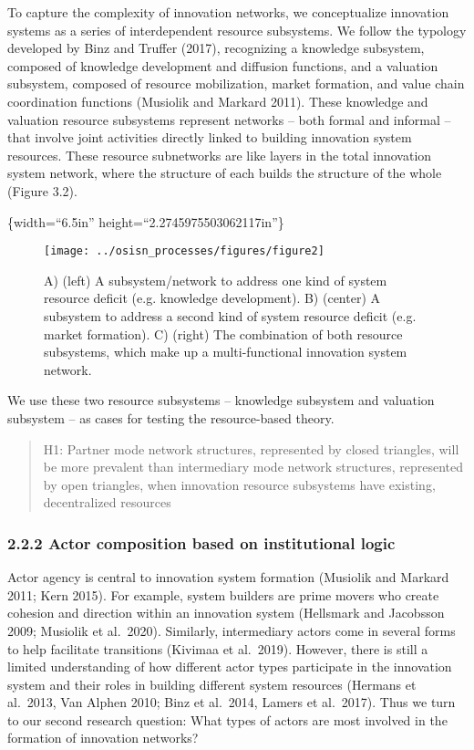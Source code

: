 \documentclass[twoside,12pt,final]{ucthesis-CA2012}
\begin{document}
\begin{ucmainmatter}
To capture the complexity of innovation networks, we conceptualize
innovation systems as a series of interdependent \textquotesingle resource
subsystems.\textquotesingle{} We follow the typology developed by Binz and Truffer
(2017), recognizing a knowledge subsystem, composed of knowledge
development and diffusion functions, and a valuation subsystem, composed
of resource mobilization, market formation, and value chain coordination
functions (Musiolik and Markard 2011). These knowledge and valuation
resource subsystems represent networks -- both formal and informal --
that involve joint activities directly linked to building innovation
system resources. These resource subnetworks are like layers in the
total innovation system network, where the structure of each builds the
structure of the whole (Figure 3.2).

\{width=``6.5in'' height=``2.2745975503062117in''\}
\begin{figure}

{\centering \texttt{[image: ../osisn\_processes/figures/figure2]} 

}

\caption{A) (left) A subsystem/network to address one kind of system resource deficit (e.g. knowledge development). B) (center) A subsystem to address a second kind of system resource deficit (e.g. market formation). C) (right) The combination of both resource subsystems, which make up a multi-functional innovation system network.}\label{fig:unnamed-chunk-22}
\end{figure}
We use these two resource subsystems -- knowledge subsystem and
valuation subsystem -- as cases for testing the resource-based theory.
\begin{quote}
H1: Partner mode network structures, represented by closed triangles,
will be more prevalent than intermediary mode network structures,
represented by open triangles, when innovation resource subsystems
have existing, decentralized resources
\end{quote}
\hypertarget{actor-composition-based-on-institutional-logic}{%
\subsubsection{2.2.2 Actor composition based on institutional logic}\label{actor-composition-based-on-institutional-logic}}

Actor agency is central to innovation system formation (Musiolik and
Markard 2011; Kern 2015). For example, \textquotesingle system builders\textquotesingle{} are prime
movers who create cohesion and direction within an innovation system
(Hellsmark and Jacobsson 2009; Musiolik et al.~2020). Similarly,
\textquotesingle intermediary\textquotesingle{} actors come in several forms to help facilitate
transitions (Kivimaa et al.~2019). However, there is still a limited
understanding of how different actor types participate in the innovation
system and their roles in building different system resources (Hermans
et al.~2013, Van Alphen 2010; Binz et al.~2014, Lamers et al.~2017).
Thus we turn to our second research question: What types of actors are
most involved in the formation of innovation networks?


\end{ucmainmatter}
\end{document}
